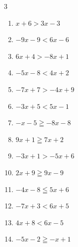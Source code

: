 \begin{multicols}{3}
\begin{enumerate}
  \item $x+6>3x-3$


  \item $-9x-9<6x-6$


  \item $6x+4>-8x+1$


  \item $-5x-8<4x+2$


  \item $-7x+7>-4x+9$


  \item $-3x+5<5x-1$


  \item $-x-5\geqq -8x-8$


  \item $9x+1\geqq 7x+2$


  \item $-3x+1>-5x+6$


  \item $2x+9\geqq 9x-9$


  \item $-4x-8\leqq 5x+6$


  \item $-7x+3<6x+5$


  \item $4x+8<6x-5$


  \item $-5x-2\geqq -x+1$


\end{enumerate}
\end{multicols}
